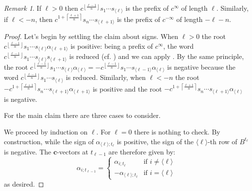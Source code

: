 \documentclass[12pt]{amsart}
\newcommand{\bfc}{\mathbf{c}}
\newcommand{\cv}{\alpha}
\renewcommand{\mod}[1]{\langle {#1} \rangle}
\newcommand{\Zidx}{\ell}
\theoremstyle{remark}
\newtheorem{remark}[theorem]{Remark}
\numberwithin{equation}{section}
\numberwithin{figure}{section}
\begin{document}
\begin{remark}
  If $\Zidx>0$ then $c^{\left\lfloor\frac{\Zidx-1}{n}\right\rfloor}s_1\cdots s_{\mod{\Zidx}}$ is the prefix of $c^\infty$ of length $\Zidx$.
  Similarly, if $\Zidx<-n$, then $c^{1+\left\lceil\frac{\Zidx+1}{n}\right\rceil}s_n\cdots s_{\mod{\Zidx+1}}$ is the prefix of $c^{-\infty}$ of length $-\Zidx-n$.
\end{remark}

\begin{proof}
  Let's begin by settling the claim about signs.
  When $\Zidx>0$ the root $c^{\left\lfloor\frac{\Zidx-1}{n}\right\rfloor}s_1\cdots s_{\mod{\Zidx}} \alpha_{\mod{\Zidx+1}}$ is positive: being a prefix of $c^\infty$, the word  $c^{\left\lfloor\frac{\Zidx-1}{n}\right\rfloor}s_1\cdots s_{\mod{\Zidx}} s_{\mod{\Zidx+1}}$ is reduced (cf. \cite{Spe09}) and we can apply \cite[VI \S 1.6, Corollary 2 of Proposition 17]{Bou02}.
  By the same principle, the root $c^{\left\lfloor\frac{\Zidx-1}{n}\right\rfloor}s_1\cdots s_{\mod{\Zidx}} \alpha_{\mod{\Zidx}} = -c^{\left\lfloor\frac{\Zidx-1}{n}\right\rfloor}s_1\cdots s_{\mod{\Zidx-1}} \alpha_{\mod{\Zidx}}$ is negative because the word $c^{\left\lfloor\frac{\Zidx-1}{n}\right\rfloor}s_1\cdots s_{\mod{\Zidx}}$ is reduced.
  Similarly, when $\Zidx<-n$ the root $-c^{1+\left\lceil\frac{\Zidx+1}{n}\right\rceil}s_n\cdots s_{\mod{\Zidx+1}} \alpha_{\mod{\Zidx+1}}$ is positive and the root $-c^{1+\left\lceil\frac{\Zidx+1}{n}\right\rceil}s_n\cdots s_{\mod{\Zidx+1}} \alpha_{\mod{\Zidx}}$ is negative.
  
  For the main claim there are three cases to consider.

  \noindent{\bf Case $-n \leq \Zidx \leq 0$.}
  We proceed by induction on $\Zidx$.
  For $\Zidx=0$ there is nothing to check.
  By construction, while the sign of $\cv_{\mod{\Zidx};t_\Zidx}$ is positive, the sign of the $\mod{\Zidx}$-th row of $B^{t_\Zidx}$ is negative.
  The $\bfc$-vectors at $t_{\Zidx-1}$ are therefore given by:
  \begin{equation*}
    \cv_{i;t_{\Zidx-1}}
    =
    \begin{cases}
      \cv_{i;t_\Zidx} & \text{if $i\neq \mod{\Zidx}$}\\
      -\cv_{\mod{\Zidx};t_\Zidx} & \text{if $i = \mod{\Zidx}$}
    \end{cases}
  \end{equation*}
  as desired.


\end{proof}
\end{document}
